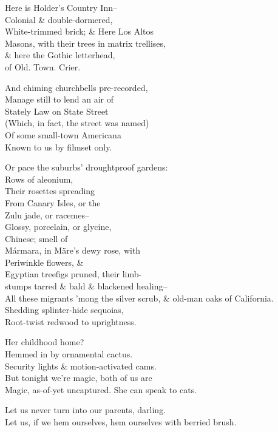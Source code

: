 Here is Holder's Country Inn-- \\
Colonial \& double-dormered, \\
White-trimmed brick; \& Here Los Altos \\
Masons, with their trees in matrix trellises, \\
\& here the Gothic letterhead, \\ 
of Old. Town. Crier.

And chiming churchbells pre-recorded, \\
Manage still to lend an air of \\
Stately Law on State Street \\
(Which, in fact, the street was named) \\
Of some small-town Americana \\
Known to us by filmset only.

Or pace the suburbs' droughtproof gardens: \\
Rows of aleonium, \\
Their rosettes spreading \\
From Canary Isles, or the \\
Zulu jade, or racemes-- \\
Glossy, porcelain, or glycine, \\
Chinese; smell of \\
Mármara, in Märe's dewy rose, with \\
Periwinkle flowers, \& \\
Egyptian treefigs pruned, their limb- \\
stumps tarred \& bald \& blackened healing-- \\
All these migrants 'mong the silver scrub,
\& old-man oaks of California. \\
Shedding splinter-hide sequoias, \\
Root-twist redwood to uprightness.

Her childhood home? \\
Hemmed in by ornamental cactus. \\
Security lights \& motion-activated cams. \\
But tonight we're magic, both of us are \\
Magic, as-of-yet uncaptured. She can speak to cats. 

Let us never turn into our parents, darling. \\
Let us, if we hem ourselves, hem ourselves with berried brush.